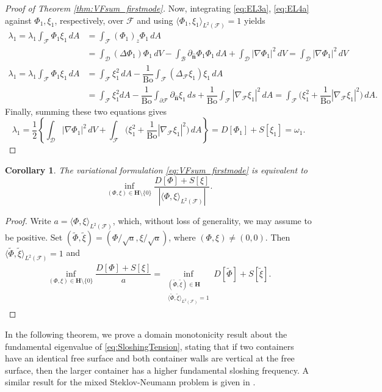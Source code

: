 \documentclass[letterpaper, 12pt]{amsart}
\newtheorem{corollary}[definition]{Corollary}
\newcommand{\bond}{\mathrm{Bo}}
\renewcommand{\H}{\mathbf{H}}
\newcommand{\D}{\mathcal{D}}
\newcommand{\B}{\mathcal{B}}
\newcommand{\F}{\mathcal{F}}
\newcommand{\n}{\mathbf{\hat{n}}}
\begin{document}
\begin{proof}[Proof of Theorem \ref{thm:VFsum_firstmode}]
Now, integrating \eqref{eq:EL3a}, \eqref{eq:EL4a} against $\Phi_1, \xi_1$, respectively, over $\F$ and using $\langle \Phi_1,\xi_1\rangle_{L^2(\F)}=1$ yields
\begin{align*}
\lambda_1 = \lambda_1\int_\F \Phi_1\xi_1\, dA & = \int_\F (\Phi_1)_z\Phi_1\, dA\\
& = \int_\D (\Delta\Phi_1)\Phi_1\, dV - \int_\B \partial_\n\Phi_1\Phi_1\, dA + \int_\D |\nabla\Phi_1|^2\, dV = \int_\D |\nabla\Phi_1|^2\, dV \\
\lambda_1 = \lambda_1\int_\F \Phi_1\xi_1\, dA & = \int_\F \xi_1^2\, dA -\dfrac{1}{\bond}\int_\F (\Delta_\F\xi_1)\xi_1\, dA\\
& = \int_\F \xi_1^2 dA - \dfrac{1}{\bond}\int_{\partial\F} \partial_\n\xi_1\, ds + \dfrac{1}{\bond}\int_\F |\nabla_\F\xi_1|^2\, dA = \int_\F \Big(\xi_1^2 + \dfrac{1}{\bond}|\nabla_\F\xi_1|^2\Big)\, dA.
\end{align*}
Finally, summing these two equations gives
\[ \lambda_1 = \dfrac{1}{2}\left\{\int_\D |\nabla\Phi_1|^2\, dV + \int_\F \Big(\xi_1^2 + \dfrac{1}{\bond}|\nabla_\F\xi_1|^2\Big)\, dA\right\} = D[\Phi_1] + S[\xi_1] = \omega_1. \]
\end{proof}


\begin{corollary}\label{thm:VFsum_equivalent}
The variational formulation \eqref{eq:VFsum_firstmode} is equivalent to 
\begin{equation}
\inf_{(\Phi,\xi)\in\H \setminus \{ 0 \}} \dfrac{D[\Phi] + S[\xi]}{ | \langle\Phi,\xi\rangle_{L^2(\F)} | }. \label{eq:VFsum_firstmode_equiv}
\end{equation}
\end{corollary}
\begin{proof}
Write $a = \langle\Phi,\xi\rangle_{L^2(\F)}$, which, without loss of generality, we may assume to be positive. Set $(\tilde\Phi, \tilde\xi) = ( \Phi / \sqrt a, \xi / \sqrt a ) $, where $(\Phi,\xi)\neq (0,0)$. Then $\langle\tilde\Phi, \tilde\xi\rangle_{L^2(\F)} = 1$ and
\begin{align*} 
 \inf_{(\Phi,\xi)\in\H\setminus\{ 0\}} \dfrac{D[\Phi] + S[\xi]}{a} 
 = \inf_{\substack{(\tilde\Phi,\tilde\xi)\in\H\\ \langle\tilde\Phi,\tilde\xi\rangle_{L^2(\F)}=1}} D[\tilde\Phi] + S[\tilde\xi].
\end{align*}
\end{proof}

In the following theorem, we prove a  domain monotonicity result about the fundamental eigenvalue of \eqref{eq:SloshingTension}, stating that if two containers have an identical free surface and both container walls are vertical at the free surface, then the larger container has a higher fundamental sloshing frequency. A similar result for the mixed Steklov-Neumann problem is given in  \cite{Moiseev:1964aa}. 
\end{document}
